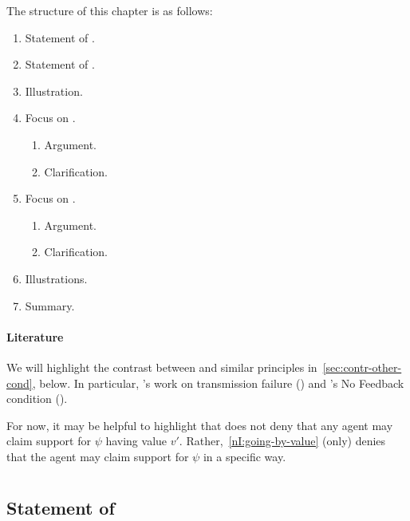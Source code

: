 \begin{note}
  The structure of this chapter is as follows:
  \begin{enumerate}
  \item Statement of \LCS{}.
  \item Statement of \FCS{}.
  \item Illustration.
  \item Focus on \LCS{}.
    \begin{enumerate}
    \item Argument.
    \item Clarification.
    \end{enumerate}
  \item Focus on \FCS{}.
    \begin{enumerate}
    \item Argument.
    \item Clarification.
    \end{enumerate}
  \item Illustrations.
  \item Summary.
  \end{enumerate}
\end{note}


\paragraph{Literature}


\begin{note}[Literature]
  We will highlight the contrast between \nI{} and similar principles in~\autoref{sec:contr-other-cond}, below.
  In particular, \citeauthor{Wright:2011wn}'s work on transmission failure (\Citeyear{Wright:2003aa,Wright:2011wn}) and \citeauthor{Weisberg:2010to}'s No Feedback condition (\Citeyear{Weisberg:2010to}).

  For now, it may be helpful to highlight that \nI{} does not deny that any agent may claim support for \(\psi\) having value \(v'\).
  Rather,~\ref{nI:going-by-value} (only) denies that the agent may claim support for \(\psi\) in a specific way.
\end{note}

\section{}
\label{sec:ni-1}

\subsection{Statement of \LCS{}}

